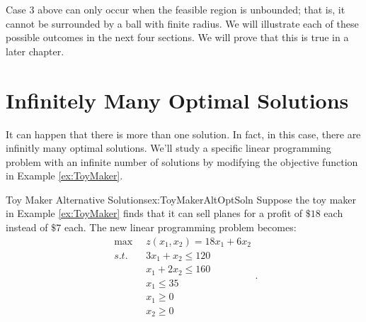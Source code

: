 Case 3 above can only occur when the feasible region is unbounded; that is, it cannot be surrounded by a ball with finite radius. We will illustrate each of these possible outcomes in the next four sections. We will prove that this is true in a later chapter.



\section{Infinitely Many Optimal Solutions}
It can happen that there is more than one solution.  In fact, in this case, there are infinitly many optimal solutions.  
We'll study a specific linear programming problem with an infinite number of solutions by modifying the objective function in Example \ref{ex:ToyMaker}. 
\begin{example}{Toy Maker Alternative Solutions}{ex:ToyMakerAltOptSoln}
Suppose the toy maker in Example \ref{ex:ToyMaker} finds that it can sell planes for a profit of $\$18$ each instead of $\$7$ each. The new linear programming problem becomes:
\begin{equation}
\begin{aligned}
\max\;\;& z(x_1,x_2) = 18x_1 + 6x_2\\
s.t.\;\;&  3x_1 + x_2 \leq 120\\
& x_1 + 2x_2 \leq 160\\
& x_1 \leq 35\\
& x_1 \geq 0\\
& x_2 \geq 0
\end{aligned}.
\label{eqn:ToyMakerAltOptSoln}
\end{equation}
\end{example}

